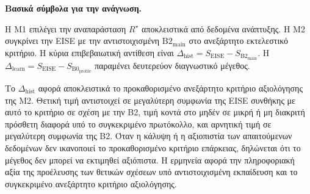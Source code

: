 \documentclass[11pt,a4paper]{article}
\begin{document}
\par\noindent\textbf{Βασικά σύμβολα για την ανάγνωση.}\par\smallskip
{}\par

Η M1 επιλέγει την αναπαράσταση $R^\star$ αποκλειστικά από δεδομένα ανάπτυξης. Η M2 συγκρίνει την EISE με την αντιστοιχισμένη $\mathrm{B2}_{\mathrm{main}}$ στο ανεξάρτητο εκτελεστικό κριτήριο. Η κύρια επιβεβαιωτική αντίθεση είναι $\Delta_{\mathrm{hist}}=S_{\mathrm{EISE}}-S_{\mathrm{B2}_{\mathrm{main}}}$. Η $\Delta_{\mathrm{learn}}=S_{\mathrm{EISE}}-S_{\mathrm{B0}_{\mathrm{profile}}}$ παραμένει δευτερεύον διαγνωστικό μέγεθος.

Το $\Delta_{\mathrm{hist}}$ αφορά αποκλειστικά το προκαθορισμένο ανεξάρτητο κριτήριο αξιολόγησης της M2. Θετική τιμή αντιστοιχεί σε μεγαλύτερη συμφωνία της EISE συνθήκης με αυτό το κριτήριο σε σχέση με την B2, τιμή κοντά στο μηδέν σε μικρή ή μη διακριτή πρόσθετη διαφορά υπό το συγκεκριμένο πρωτόκολλο, και αρνητική τιμή σε μεγαλύτερη συμφωνία της B2. Όταν η κάλυψη ή η αξιοπιστία των απαιτούμενων δεδομένων δεν ικανοποιεί το προκαθορισμένο κριτήριο επάρκειας, δηλώνεται ότι το μέγεθος δεν μπορεί να εκτιμηθεί αξιόπιστα. Η ερμηνεία αφορά την πληροφοριακή αξία της προέλευσης των θετικών σχέσεων υπό αντιστοιχισμένη εκπαίδευση και το συγκεκριμένο ανεξάρτητο κριτήριο αξιολόγησης.
\end{document}
